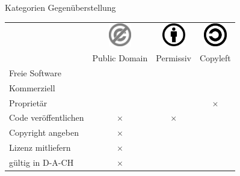 \begin{frame}{Kategorien Gegenüberstellung}
	\newcommand{\yes}{\color{green}\checkmark}
	\newcommand{\no}{\boldmath \color{red}$\times$}
	\begin{tabular}{lccc}
		& \includegraphics[width=1cm]{res/PD-icon.pdf} & \includegraphics[width=1cm]{res/by.pdf} & \includegraphics[width=1cm]{res/copyleft.pdf} \\ 
		& Public Domain & Permissiv & Copyleft \\ 
		\hline 
		Freie Software & \yes & \yes & \yes \\ 
		\hline 
		Kommerziell & \yes & \yes & \yes \\ 
		\hline 
		Proprietär & \yes & \yes & \no \\ 
		\hline 
		Code veröffentlichen & \no & \no & \yes \\ 
		\hline 
		Copyright angeben & \no & \yes & \yes \\ 
		\hline 
		Lizenz mitliefern & \no & \yes & \yes \\ 
		\hline 
		gültig in D-A-CH & \no & \yes & \yes \\
		\hline 
	\end{tabular} 
\end{frame}{

}
